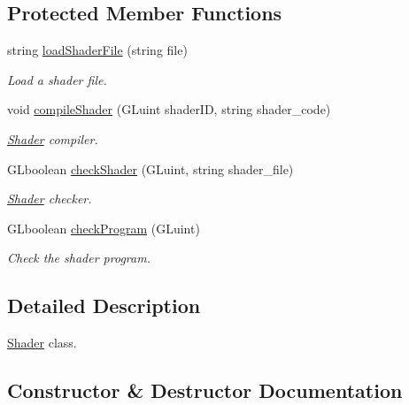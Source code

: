 \subsection*{Protected Member Functions}
\begin{DoxyCompactItemize}
\item 
string \mbox{\hyperlink{classShader_a080150b058525de4f338edb6c6bdd450}{load\+Shader\+File}} (string file)
\begin{DoxyCompactList}\small\item\em Load a shader file. \end{DoxyCompactList}\item 
void \mbox{\hyperlink{classShader_a69ca69aecbaa3dc7a84a00e80af786fe}{compile\+Shader}} (G\+Luint shader\+ID, string shader\+\_\+code)
\begin{DoxyCompactList}\small\item\em \mbox{\hyperlink{classShader}{Shader}} compiler. \end{DoxyCompactList}\item 
G\+Lboolean \mbox{\hyperlink{classShader_abde0c096ccae8bd72639e6203239d0a5}{check\+Shader}} (G\+Luint, string shader\+\_\+file)
\begin{DoxyCompactList}\small\item\em \mbox{\hyperlink{classShader}{Shader}} checker. \end{DoxyCompactList}\item 
G\+Lboolean \mbox{\hyperlink{classShader_a279452402be44a4e97f0be5838fe7e79}{check\+Program}} (G\+Luint)
\begin{DoxyCompactList}\small\item\em Check the shader program. \end{DoxyCompactList}\end{DoxyCompactItemize}


\subsection{Detailed Description}
\mbox{\hyperlink{classShader}{Shader}} class. 



\subsection{Constructor \& Destructor Documentation}
\mbox{\label{classShader_acfcee4e7b4f223f83d7bd5bce5cf36c0}} 
